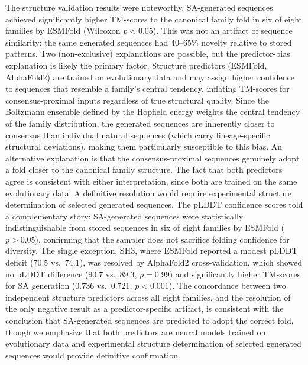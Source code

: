 The structure validation results were noteworthy. SA-generated sequences achieved significantly higher TM-scores to the canonical family fold in six of eight families by ESMFold (Wilcoxon $p < 0.05$). This was not an artifact of sequence similarity: the same generated sequences had $40$--$65\%$ novelty relative to stored patterns. Two (non-exclusive) explanations are possible, but the predictor-bias explanation is likely the primary factor. Structure predictors (ESMFold, AlphaFold2) are trained on evolutionary data and may assign higher confidence to sequences that resemble a family's central tendency, inflating TM-scores for consensus-proximal inputs regardless of true structural quality. Since the Boltzmann ensemble defined by the Hopfield energy weights the central tendency of the family distribution, the generated sequences are inherently closer to consensus than individual natural sequences (which carry lineage-specific structural deviations), making them particularly susceptible to this bias. An alternative explanation is that the consensus-proximal sequences genuinely adopt a fold closer to the canonical family structure. The fact that both predictors agree is consistent with either interpretation, since both are trained on the same evolutionary data. A definitive resolution would require experimental structure determination of selected generated sequences. The pLDDT confidence scores told a complementary story: SA-generated sequences were statistically indistinguishable from stored sequences in six of eight families by ESMFold ($p > 0.05$), confirming that the sampler does not sacrifice folding confidence for diversity. The single exception, SH3, where ESMFold reported a modest pLDDT deficit ($70.5$ vs.\ $74.1$), was resolved by AlphaFold2 cross-validation, which showed no pLDDT difference ($90.7$ vs.\ $89.3$, $p{=}0.99$) and significantly higher TM-scores for SA generation ($0.736$ vs.\ $0.721$, $p < 0.001$). The concordance between two independent structure predictors across all eight families, and the resolution of the only negative result as a predictor-specific artifact, is consistent with the conclusion that SA-generated sequences are predicted to adopt the correct fold, though we emphasize that both predictors are neural models trained on evolutionary data and experimental structure determination of selected generated sequences would provide definitive confirmation.

